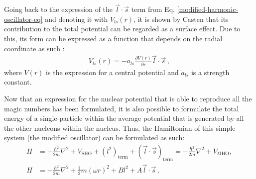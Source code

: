 Going back to the expression of the $\vec{l}\cdot\vec{s}$ term from Eq. \ref{modified-harmonic-oscillator-eq} and denoting it with $V_{ls}(r)$, it is shown by Casten \cite{casten2000nuclear} that its contribution to the total potential can be regarded as a surface effect. Due to this, its form can be expressed as a function that depends on the radial coordinate as such \cite{casten2000nuclear}:
\begin{align}
    V_{ls}(r)=-a_{ls}\frac{\partial V(r)}{\partial r}\vec{l}\cdot\vec{s}\ ,
\end{align}
where $V(r)$ is the expression for a central potential and $a_{ls}$ is a strength constant.

Now that an expression for the nuclear potential that is able to reproduce all the magic numbers has been formulated, it is also possible to formulate the total energy of a single-particle within the average potential that is generated by all the other nucleons within the nucleus. Thus, the Hamiltonian of this simple system (the modified oscillator) can be formulated as such:
\begin{align}
    H&=-\frac{\hbar^2}{2m}\nabla^2+V_\text{SHO}+(l^2)_\text{term}+(\vec{l}\cdot\vec{s})_\text{term}=-\frac{\hbar^2}{2m}\nabla^2+V_\text{MHO} , \nonumber\\
    H&=-\frac{\hbar^2}{2m}\nabla^2+\frac{1}{2}m(\omega r)^2+Bl^2+A\vec{l}\cdot\vec{s}\ .
\end{align}

